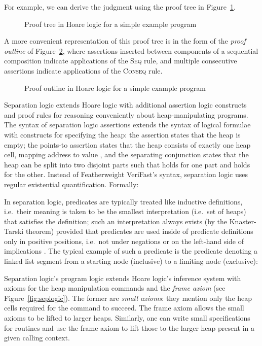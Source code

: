 \documentclass{CSML}
\theoremstyle{definition}\newtheorem{notation}[thm]{Notation}
\theoremstyle{plain}\newtheorem{satz}[thm]{Satz}
\begin{document}
For example, we can derive the judgment  using the proof 
tree in Figure~\ref{fig:hoare-tree}.

\begin{figure}


\caption{Proof tree in Hoare logic for a simple example program}\label{fig:hoare-tree}
\end{figure}

A more convenient representation of this proof tree is in the form of the \emph{proof outline} of Figure~\ref{fig:hoare-outline}, where assertions inserted between components of a
sequential composition indicate applications of the \textsc{Seq} rule, and multiple consecutive assertions indicate applications of the \textsc{Conseq}
rule.
\begin{figure}

\caption{Proof outline in Hoare logic for a simple example program}\label{fig:hoare-outline}
\end{figure}

Separation logic extends Hoare logic with additional assertion logic constructs and proof rules for reasoning conveniently about heap-manipulating programs.
The syntax of separation logic assertions extends the syntax of logical formulae with constructs for specifying the heap: the assertion  states
that the heap is empty; the points-to assertion  states that the heap consists of exactly one heap cell, mapping address  to value , and
the separating conjunction  states that the heap can be split into two disjoint parts such that  holds for one part and  holds for the other.
Instead of Featherweight VeriFast's  syntax, separation logic uses regular existential quantification. Formally:

In separation logic, predicates are typically treated like inductive definitions, i.e.~their meaning is taken to be the smallest interpretation
(i.e.~set of heaps) that satisfies the definition;
such an interpretation always exists (by the Knaster-Tarski theorem) provided that predicates are used inside of predicate
definitions only in positive positions, i.e.~not under negations or on the left-hand side of implications \cite{seplogic-abstraction}.
The typical example of such a predicate is the predicate  denoting a linked list segment from a starting node  (inclusive)
to a limiting node  (exclusive):

Separation logic's program logic extends Hoare logic's inference system with axioms for the heap manipulation commands and the \emph{frame axiom} (see Figure~\ref{fig:seplogic}).
The former are \emph{small axioms}: they mention only the heap cells required for the command to succeed. The frame axiom allows the small axioms to be lifted to larger
heaps. Similarly, one can write small specifications for routines and use the frame axiom to lift those to the larger heap present in a given calling context.
\end{document}
